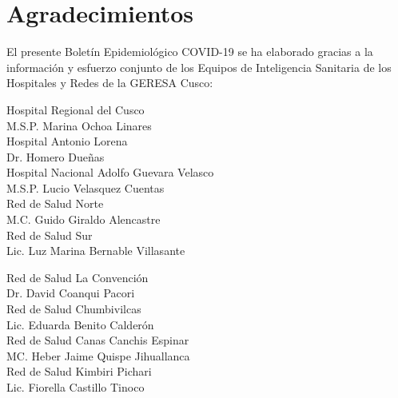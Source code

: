 \documentclass[12pt,a4paper,openany]{book}
\begin{document}
	\section*{Agradecimientos}
		
	\centering
		{\large El presente Boletín Epidemiológico COVID-19 se ha elaborado gracias a la información y esfuerzo conjunto de los Equipos de Inteligencia Sanitaria de los Hospitales y Redes de la GERESA Cusco:

		\vspace{0.5cm}
		\noindent
		\begin{minipage}[t]{.45\textwidth}
			\centering
			Hospital Regional del Cusco \\
			M.S.P. Marina Ochoa Linares \vspace{0.5cm}\\
			Hospital Antonio Lorena \\
			Dr. Homero Dueñas \vspace{.5cm}\\
			Hospital Nacional Adolfo Guevara Velasco\\
			M.S.P. Lucio Velasquez Cuentas \vspace{.5cm}\\
			Red de Salud Norte \\
			M.C. Guido Giraldo Alencastre\vspace{0.5cm}\\
			Red de Salud Sur\\
			Lic. Luz Marina Bernable Villasante \vspace{0.5cm}\\	
		\end{minipage}
		\hfill
		\noindent
		\begin{minipage}[t]{.45\textwidth}
			\centering
			Red de Salud La Convención\\
			Dr. David Coanqui Pacori\vspace{0.5cm}\\
			Red de Salud Chumbivilcas\\
			Lic. Eduarda Benito Calderón \vspace{.5cm}\\
			Red de Salud Canas Canchis Espinar\\
			MC. Heber Jaime Quispe Jihuallanca \vspace{.5cm}\\
			Red de Salud Kimbiri Pichari \\
			Lic. Fiorella Castillo Tinoco\vspace{0.5cm}\\	
		\end{minipage}
}
\end{document}
